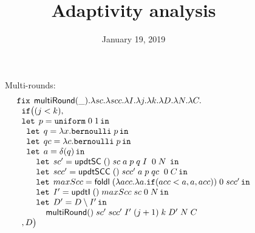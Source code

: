 \documentclass[a4paper,11pt]{article}
\title{Adaptivity analysis}
\author{}
\date{January 19, 2019}
\theoremstyle{definition}
\begin{document}
\maketitle


\newpage
\begin{figure}

Multi-rounds:
\[
\begin{array}{l}
 \mathop{\mathtt{fix}} \;  \mathsf{multiRound}(\_). \lambda sc. \lambda scc. \lambda
  I. \lambda j. \lambda k. \lambda D. \lambda N. \lambda C. \\
 \hspace{.2cm} \mathtt{if}   \big (   (j < k)  ,  \\
  \hspace{.2cm} \mathop{\mathtt{let}} \; p = \mathtt{uniform} \; 0 \; 1 \mathop{ \mathtt{in}} \\
  \hspace{0.4cm} \mathop{\mathtt{let}} \; q = \lambda x. \mathtt{bernoulli} \; p \mathop{ \mathtt{in}} \\
 \hspace{0.4cm} \mathop{\mathtt{let}} \; qc = \lambda c. \mathtt{bernoulli} \; p \mathop{ \mathtt{in}} \\
 \hspace{0.4cm} \mathop{\mathtt{let}} \; a = \delta (q)  \mathop{ \mathtt{in}} \\
 \hspace{0.8cm} \mathop{\mathtt{let}} \; sc' =  \mathsf{updtSC} \; () \; sc  \; a \; p
 \; q \; I \;  \; 0 \;  N
  \;  \mathop{ \mathtt{in}} \\
\hspace{0.8cm} \mathop{\mathtt{let}} \; scc' =  \mathsf{updtSCC} \; () \; scc' \; a \; p
 \; qc \;  \; 0 \;  C \mathop{ \mathtt{in}} \\
\hspace{0.8cm} \mathop{\mathtt{let}} \; maxScc =  \mathsf{foldl} \; (\lambda acc. \lambda a. \mathtt{if} ( acc < a, a, acc)) \; 0 \; scc' \mathop{ \mathtt{in}} \\
\hspace{0.8cm} \mathop{\mathtt{let}} \; I' =  \mathsf{updtI}  \; () \; maxScc \; sc
  \; 0 \; N  \mathop{ \mathtt{in}} \\
  \hspace{0.8cm} \mathop{\mathtt{let}} \; D' =  D \setminus I' \mathop{ \mathtt{in}} \\
  \hspace{1.2cm} \mathsf{multiRound} ()  \; sc' \; scc' \; I'
  \; (j+1) \;  k \; D' \; N \; C\\ 
\hspace{0.2cm}   ,     D  \big ) \\
 

\end{array}\]
\end{figure}
\end{document}
